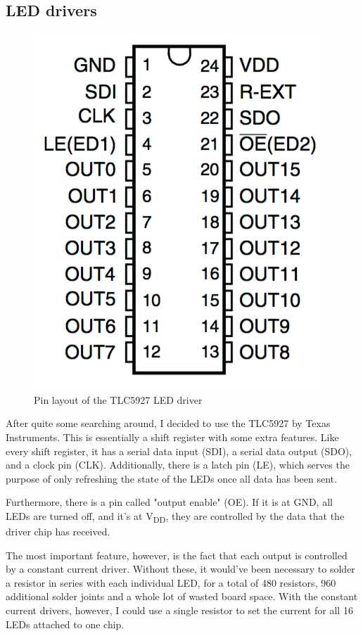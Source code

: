 \documentclass[a4paper, 11pt, titlepage]{report}
\def \vdd {V\textsubscript{DD}}
\begin{document}
\newpage
\subsection{LED drivers}


\begin{figure}

\includegraphics[scale=0.35]{./images/tlc-pins.png}
\caption{Pin layout of the TLC5927 LED driver}

\end{figure}

After quite some searching around, I decided to use the TLC5927 by Texas Instruments. This is
essentially a shift register with some extra features. Like every shift register, it has a serial
data input (SDI), a serial data output (SDO), and a clock pin (CLK). Additionally, there is a latch
pin (LE), which serves the purpose of only refreshing the state of the LEDs once all data has been
sent.

Furthermore, there is a pin called "output enable" (OE). If it is at GND, all LEDs are turned off,
and it's at \vdd, they are controlled by the data that the driver chip has received.

The most important feature, however, is the fact that each output is controlled by a constant
current driver. Without these, it would've been necessary to solder a resistor in series
with each individual LED, for a total of 480 resistors, 960 additional solder joints and a whole
lot of wasted board space. With the constant current drivers, however, I could use a single
resistor to set the current for all 16 LEDs attached to one chip.
\end{document}
